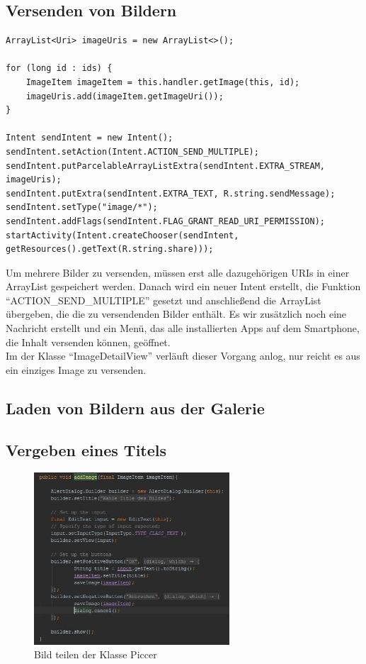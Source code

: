 \subsection{Versenden von Bildern}

\begin{lstlisting}
ArrayList<Uri> imageUris = new ArrayList<>();

for (long id : ids) {
    ImageItem imageItem = this.handler.getImage(this, id);
    imageUris.add(imageItem.getImageUri());
}

Intent sendIntent = new Intent();
sendIntent.setAction(Intent.ACTION_SEND_MULTIPLE);
sendIntent.putParcelableArrayListExtra(sendIntent.EXTRA_STREAM, imageUris);
sendIntent.putExtra(sendIntent.EXTRA_TEXT, R.string.sendMessage);
sendIntent.setType("image/*");
sendIntent.addFlags(sendIntent.FLAG_GRANT_READ_URI_PERMISSION);
startActivity(Intent.createChooser(sendIntent, getResources().getText(R.string.share)));
\end{lstlisting}
Um mehrere Bilder zu versenden, müssen erst alle dazugehörigen URIs in einer ArrayList gespeichert werden. Danach wird ein neuer Intent erstellt, die Funktion \enquote{ACTION\_SEND\_MULTIPLE} gesetzt und anschließend die ArrayList übergeben, die die zu versendenden Bilder enthält. Es wir zusätzlich noch eine Nachricht erstellt und ein Menü, das alle installierten Apps auf dem Smartphone, die Inhalt versenden können, geöffnet.\\
Im der Klasse \enquote{ImageDetailView} verläuft dieser Vorgang anlog, nur reicht es aus  ein einziges Image zu versenden. 

\subsection{Laden von Bildern aus der Galerie}
\subsection{Vergeben eines Titels}
\begin{figure}[H]
\label{Share_Item}
\centering
\includegraphics[width=0.65\textwidth]{images/Dialog}
\caption{Bild teilen der Klasse Piccer}
\end{figure}

